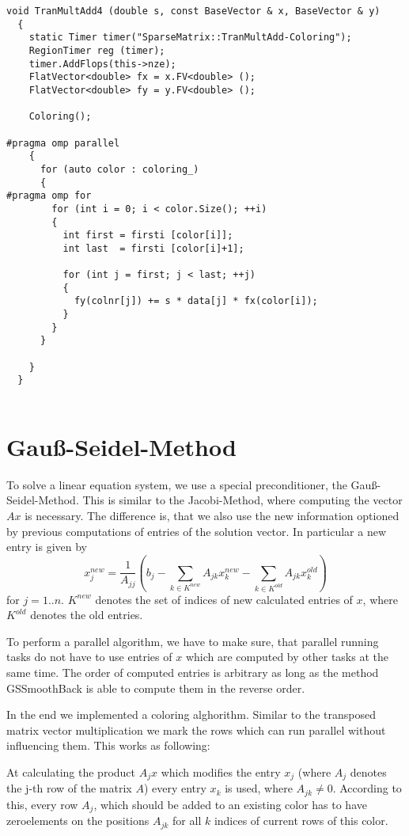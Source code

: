 \documentclass[a4paper,11pt]{scrartcl}
\begin{document}
\begin{lstlisting}
void TranMultAdd4 (double s, const BaseVector & x, BaseVector & y)
  {
    static Timer timer("SparseMatrix::TranMultAdd-Coloring");
    RegionTimer reg (timer);
    timer.AddFlops(this->nze);
    FlatVector<double> fx = x.FV<double> ();
    FlatVector<double> fy = y.FV<double> ();

    Coloring();

#pragma omp parallel
    {
      for (auto color : coloring_)
      {
#pragma omp for
        for (int i = 0; i < color.Size(); ++i)
        {
          int first = firsti [color[i]];
          int last  = firsti [color[i]+1];

          for (int j = first; j < last; ++j)
          {
            fy(colnr[j]) += s * data[j] * fx(color[i]);
          }
        }
      }

    }
  }


\end{lstlisting}

\section{Gauß-Seidel-Method}
To solve a linear equation system, we use a special preconditioner, the 
Gauß-Seidel-Method. This is similar to the Jacobi-Method, where computing
 the vector $Ax$ is necessary. The difference is,
that we also use the new information optioned by previous computations of
entries of the solution vector. In particular a new entry is given by
$$ x_j^{new} = \frac{1}{A_{jj}} (b_{j} - \sum_{k \in K^{new}}A_{jk} x_k^{new}
 - \sum_{k \in K^{old}}A_{jk} x_k^{old})$$
for $j = 1..n$. $K^{new}$ denotes the set of indices of new calculated entries
 of $x$, where $K^{old}$ denotes the old entries.

To perform a parallel algorithm, we have to make sure, that parallel 
running tasks do not have to use entries of $x$ which are computed by other
tasks at the same time. The order of computed entries is arbitrary as long as
the method GSSmoothBack is able to compute them in the reverse order.
 
In the end we implemented a coloring alghorithm.
Similar to the transposed matrix vector multiplication we mark the rows which
can run parallel without influencing them. This works as following:

At calculating the product $A_jx$ which modifies the entry $x_j$ (where $A_j$ 
denotes the j-th row of the matrix $A$) every entry $x_k$ is used, where
 $A_{jk} \neq 0$. According to this, every row $A_j$, which should be added 
to an existing color has to have zeroelements on the positions $A_{jk}$ for 
all $k$ indices of current rows of this color. 
\end{document}
